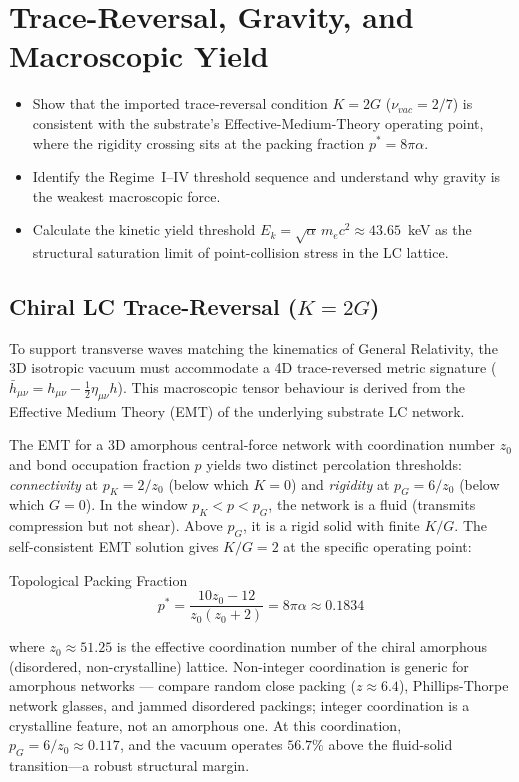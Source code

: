 \chapter{Trace-Reversal, Gravity, and Macroscopic Yield}
\label{ch:gravity_and_yield}


\begin{objectivebox}
\begin{itemize}
    \item Show that the imported trace-reversal condition $K=2G$ ($\nu_{vac}=2/7$) is consistent with the substrate's Effective-Medium-Theory operating point, where the rigidity crossing sits at the packing fraction $p^* = 8\pi\alpha$.
    \item Identify the Regime~I--IV threshold sequence and understand why gravity is the weakest macroscopic force.
    \item Calculate the kinetic yield threshold $E_k = \sqrt{\alpha}\,m_e c^2 \approx 43.65$~keV as the structural saturation limit of point-collision stress in the LC lattice.
\end{itemize}
\end{objectivebox}

\section{Chiral LC Trace-Reversal ($K=2G$)}

To support transverse waves matching the kinematics of General Relativity, the 3D isotropic vacuum must accommodate a 4D trace-reversed metric signature ($\bar{h}_{\mu\nu} = h_{\mu\nu} - \frac{1}{2}\eta_{\mu\nu}h$). This macroscopic tensor behaviour is derived from the Effective Medium Theory (EMT) of the underlying substrate LC network.

The EMT for a 3D amorphous central-force network with coordination number $z_0$ and bond occupation fraction $p$ yields two distinct percolation thresholds: \textit{connectivity} at $p_K = 2/z_0$ (below which $K = 0$) and \textit{rigidity} at $p_G = 6/z_0$ (below which $G = 0$). In the window $p_K < p < p_G$, the network is a fluid (transmits compression but not shear). Above $p_G$, it is a rigid solid with finite $K/G$. The self-consistent EMT solution gives $K/G = 2$ at the specific operating point:
\begin{resultbox}{Topological Packing Fraction}
\begin{equation}
    p^* = \frac{10 z_0 - 12}{z_0(z_0 + 2)} = 8\pi\alpha \approx 0.1834
\end{equation}
\end{resultbox}
where $z_0 \approx 51.25$ is the effective coordination number of the chiral amorphous (disordered, non-crystalline) lattice. Non-integer coordination is generic for amorphous networks — compare random close packing ($z \approx 6.4$), Phillips-Thorpe network glasses, and jammed disordered packings; integer coordination is a crystalline feature, not an amorphous one. At this coordination, $p_G = 6/z_0 \approx 0.117$, and the vacuum operates $56.7\%$ above the fluid-solid transition---a robust structural margin.

